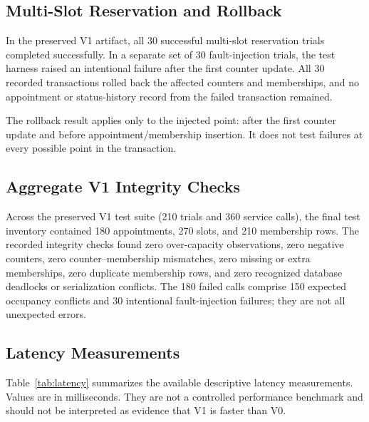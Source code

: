 \documentclass[conference]{IEEEtran}
\begin{document}
\iffalse
\subsection{Multi-Slot Reservation and Rollback}
In the preserved V1 artifact, all 30 successful multi-slot reservation trials completed successfully. In a separate set of 30 fault-injection trials, the test harness raised an intentional failure after the first counter update. All 30 recorded transactions rolled back the affected counters and memberships, and no appointment or status-history record from the failed transaction remained.

\begin{table}[!t]
\caption{E6: Multi-Slot Reservation and Injected Failure}
\label{tab:e6}
\centering
\scriptsize
{}%
\end{table}

The rollback result applies only to the injected point: after the first counter update and before appointment/membership insertion. It does not test failures at every possible point in the transaction.

\subsection{Aggregate V1 Integrity Checks}
Across the preserved V1 test suite (210 trials and 360 service calls), the final test inventory contained 180 appointments, 270 slots, and 210 membership rows. The recorded integrity checks found zero over-capacity observations, zero negative counters, zero counter--membership mismatches, zero missing or extra memberships, zero duplicate membership rows, and zero recognized database deadlocks or serialization conflicts. The 180 failed calls comprise 150 expected occupancy conflicts and 30 intentional fault-injection failures; they are not all unexpected errors.

\subsection{Latency Measurements}
Table~\ref{tab:latency} summarizes the available descriptive latency measurements. Values are in milliseconds. They are not a controlled performance benchmark and should not be interpreted as evidence that V1 is faster than V0.
\end{document}

